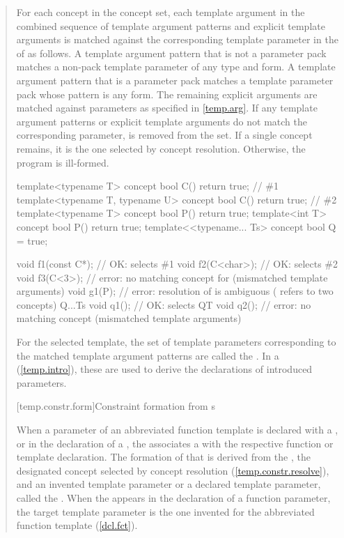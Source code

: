 \begin{quote}
\pnum
For each concept  in the concept set, each template 
argument in the combined sequence of template argument patterns and explicit 
template arguments is matched against the corresponding template parameter
in the  of 
 as follows.
% 
A template argument pattern that is not a parameter pack matches a 
non-pack template parameter of any type and form. A template argument 
pattern that is a parameter pack matches a template parameter pack
whose pattern is any form.
% 
The remaining explicit arguments are matched against parameters
as specified in \ref{temp.arg}.
% 
If any template argument patterns or explicit template arguments do not 
match the corresponding parameter,  is removed from the set.
% 
If a single concept remains, it is the one selected by concept 
resolution. Otherwise, the program is ill-formed. 
% 
\enterexample
\begin{codeblock}
template<typename T> concept bool C() { return true; }             // \#1
template<typename T, typename U> concept bool C() { return true; } // \#2
template<typename T> concept bool P() { return true; }
template<int T> concept bool P() { return true; }
template<<typename... Ts> concept bool Q = true;

void f1(const C*);  // OK:  selects \#1
void f2(C<char>);   // OK:  selects \#2
void f3(C<3>);      // error: no matching concept for  (mismatched template arguments)
void g1(P);         // error: resolution of  is ambiguous ( refers to two concepts)
Q{...Ts} void q1(); // OK: selects 
Q{T} void q2();     // error: no matching concept (mismatched template arguments)
\end{codeblock}
\exitexample

\pnum
For the selected template, the set of template parameters corresponding
to the matched template argument patterns are called the
. 
% 
In a  (\ref{temp.intro}), these
are used to derive the declarations of introduced parameters.


[temp.constr.form]{Constraint formation from s}

\pnum
When a parameter of an abbreviated function template is declared
with a ,
or in the declaration of a 
,
the 
associates a 
with the respective function or template declaration.
% 
The formation of that 
is derived from the ,
the designated concept selected by concept resolution 
(\ref{temp.constr.resolve}), and an 
invented template parameter or a declared template parameter, called
the .
% 
When the 
appears in the declaration of a function parameter, the target template
parameter is the one invented for the abbreviated function template
(\ref{dcl.fct}).


\end{quote}

